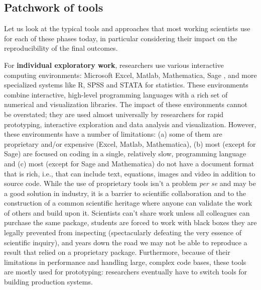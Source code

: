 \documentclass[ChapterTOCs,krantz2]{krantz} %
\begin{document}
\subsection{Patchwork of tools}

Let us look at the typical tools and approaches that most working scientists
use for each of these phases today, in particular considering their impact on
the reproducibility of the final outcomes. 

For \textbf{individual exploratory work}, researchers use various interactive
computing environments: Microsoft Excel, Matlab, Mathematica, Sage \cite{sage},
and more specialized systems like R, SPSS and STATA for statistics. These
environments combine interactive, high-level programming languages with a rich
set of numerical and visualization libraries. The impact of these environments
cannot be overstated; they are used almost universally by researchers for rapid
prototyping, interactive exploration and data analysis and
visualization. However, these environments have a number of limitations: (a)
some of them are proprietary and/or expensive (Excel, Matlab, Mathematica), (b)
most (except for Sage) are focused on coding in a single, relatively slow,
programming language and (c) most (except for Sage and Mathematica) do not have
a document format that is rich, i.e., that can include text, equations, images
and video in addition to source code. While the use of proprietary tools isn't
a problem \emph{per se} and may be a good solution in industry, it is a barrier
to scientific collaboration and to the construction of a common scientific
heritage where anyone can validate the work of others and build upon it.
Scientists can't share work unless all colleagues can purchase the same
package, students are forced to work with black boxes they are legally
prevented from inspecting (spectacularly defeating the very essence of
scientific inquiry), and years down the road we may not be able to reproduce a
result that relied on a proprietary package. Furthermore, because of their
limitations in performance and handling large, complex code bases, these tools
are mostly used for prototyping: researchers eventually have to switch tools
for building production systems.
\end{document}
